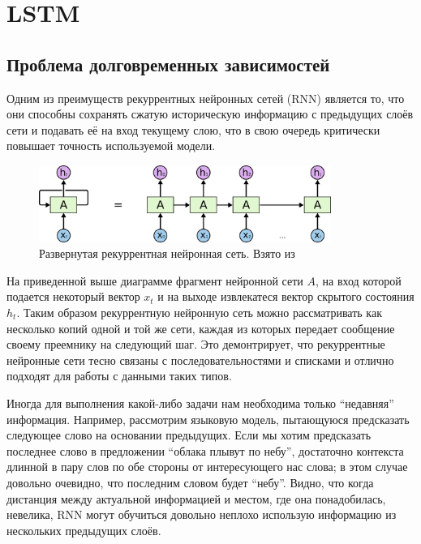 \documentclass[14pt]{extarticle}
\begin{document}
\section{LSTM}

\subsection{Проблема долговременных зависимостей}

Одним из преимуществ рекуррентных нейронных сетей (RNN) является то, что они способны сохранять сжатую историческую информацию с предыдущих слоёв сети и подавать её на вход текущему слою, что в свою очередь критически повышает точность используемой модели.

\begin{figure}[h]
	\centering
	\includegraphics[width=0.85\textwidth]{img/RNN-unrolled.png}
	\caption{Развернутая рекуррентная нейронная сеть. Взято из \cite{Liu2018DeepRL}}
	\label{fig:rnn}
\end{figure}

На приведенной выше диаграмме фрагмент нейронной сети $A$, на вход которой подается некоторый вектор $x_t$ и на выходе извлекатеся вектор скрытого состояния $h_t$. Таким образом рекуррентную нейронную сеть можно рассматривать как несколько копий одной и той же сети, каждая из которых передает сообщение своему преемнику на следующий шаг. Это демонтрирует, что рекуррентные нейронные сети тесно связаны с последовательностями и списками и отлично подходят для работы с данными таких типов. 

Иногда для выполнения какой-либо задачи нам необходима только “недавняя” информация. Например, рассмотрим языковую модель, пытающуюся предсказать следующее слово на основании предыдущих. Если мы хотим предсказать последнее слово в предложении “облака плывут по небу”, достаточно контекста длинной в пару слов по обе стороны от интересующего нас слова; в этом случае довольно очевидно, что последним словом будет “небу”. Видно, что когда дистанция между актуальной информацией и местом, где она понадобилась, невелика, RNN могут обучиться довольно неплохо использую информацию из нескольких предыдущих слоёв.
\end{document}
